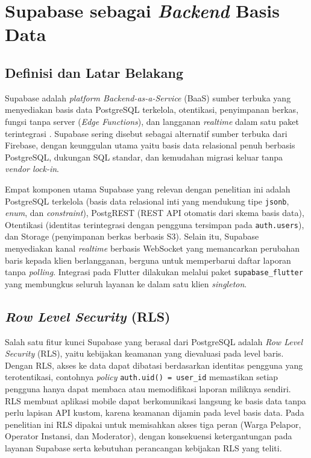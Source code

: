 \section{Supabase sebagai \textit{Backend} Basis Data}
\label{sec:supabase}

\subsection{Definisi dan Latar Belakang}

Supabase adalah \textit{platform Backend-as-a-Service} (BaaS) sumber terbuka yang menyediakan basis data PostgreSQL terkelola, otentikasi, penyimpanan berkas, fungsi tanpa server (\textit{Edge Functions}), dan langganan \textit{realtime} dalam satu paket terintegrasi \citep{supabaseDoc2024}. Supabase sering disebut sebagai alternatif sumber terbuka dari Firebase, dengan keunggulan utama yaitu basis data relasional penuh berbasis PostgreSQL, dukungan SQL standar, dan kemudahan migrasi keluar tanpa \textit{vendor lock-in}.

Empat komponen utama Supabase yang relevan dengan penelitian ini adalah PostgreSQL terkelola (basis data relasional inti yang mendukung tipe \texttt{jsonb}, \textit{enum}, dan \textit{constraint}), PostgREST (REST API otomatis dari skema basis data), Otentikasi (identitas terintegrasi dengan pengguna tersimpan pada \texttt{auth.users}), dan Storage (penyimpanan berkas berbasis S3). Selain itu, Supabase menyediakan kanal \textit{realtime} berbasis WebSocket yang memancarkan perubahan baris kepada klien berlangganan, berguna untuk memperbarui daftar laporan tanpa \textit{polling}. Integrasi pada Flutter dilakukan melalui paket \texttt{supabase\_flutter} yang membungkus seluruh layanan ke dalam satu klien \textit{singleton}.

\subsection{\textit{Row Level Security} (RLS)}

Salah satu fitur kunci Supabase yang berasal dari PostgreSQL adalah \textit{Row Level Security} (RLS), yaitu kebijakan keamanan yang dievaluasi pada level baris. Dengan RLS, akses ke data dapat dibatasi berdasarkan identitas pengguna yang terotentikasi, contohnya \textit{policy} \texttt{auth.uid() = user\_id} memastikan setiap pengguna hanya dapat membaca atau memodifikasi laporan miliknya sendiri. RLS membuat aplikasi mobile dapat berkomunikasi langsung ke basis data tanpa perlu lapisan API kustom, karena keamanan dijamin pada level basis data. Pada penelitian ini RLS dipakai untuk memisahkan akses tiga peran (Warga Pelapor, Operator Instansi, dan Moderator), dengan konsekuensi ketergantungan pada layanan Supabase serta kebutuhan perancangan kebijakan RLS yang teliti.

